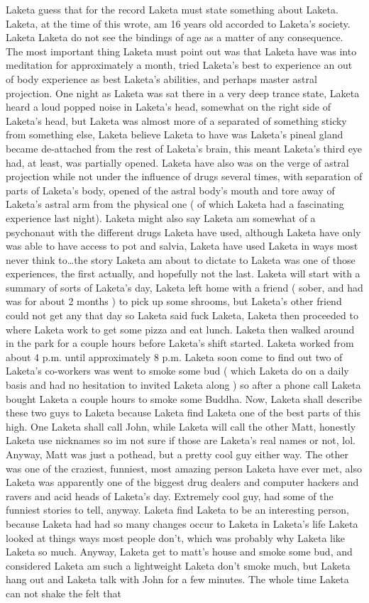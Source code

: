\documentclass[12pt]{book}
\begin{document}
Laketa guess that for the record Laketa must state something about Laketa. Laketa, at the time of this wrote, am 16 years old accorded to Laketa's society. Laketa Laketa do not see the bindings of age as a matter of any consequence. The most important thing Laketa must point out was that Laketa have was into meditation for approximately a month, tried Laketa's best to experience an out of body experience as best Laketa's abilities, and perhaps master astral projection. One night as Laketa was sat there in a very deep trance state, Laketa heard a loud popped noise in Laketa's head, somewhat on the right side of Laketa's head, but Laketa was almost more of a separated of something sticky from something else, Laketa believe Laketa to have was Laketa's pineal gland became de-attached from the rest of Laketa's brain, this meant Laketa's third eye had, at least, was partially opened. Laketa have also was on the verge of astral projection while not under the influence of drugs several times, with separation of parts of Laketa's body, opened of the astral body's mouth and tore away of Laketa's astral arm from the physical one ( of which Laketa had a fascinating experience last night). Laketa might also say Laketa am somewhat of a psychonaut with the different drugs Laketa have used, although Laketa have only was able to have access to pot and salvia, Laketa have used Laketa in ways most never think to\ldots the story Laketa am about to dictate to Laketa was one of those experiences, the first actually, and hopefully not the last. Laketa will start with a summary of sorts of Laketa's day, Laketa left home with a friend ( sober, and had was for about 2 months ) to pick up some shrooms, but Laketa's other friend could not get any that day so Laketa said fuck Laketa, Laketa then proceeded to where Laketa work to get some pizza and eat lunch. Laketa then walked around in the park for a couple hours before Laketa's shift started. Laketa worked from about 4 p.m. until approximately 8 p.m. Laketa soon come to find out two of Laketa's co-workers was went to smoke some bud ( which Laketa do on a daily basis and had no hesitation to invited Laketa along ) so after a phone call Laketa bought Laketa a couple hours to smoke some Buddha. Now, Laketa shall describe these two guys to Laketa because Laketa find Laketa one of the best parts of this high. One Laketa shall call John, while Laketa will call the other Matt, honestly Laketa use nicknames so im not sure if those are Laketa's real names or not, lol. Anyway, Matt was just a pothead, but a pretty cool guy either way. The other was one of the craziest, funniest, most amazing person Laketa have ever met, also Laketa was apparently one of the biggest drug dealers and computer hackers and ravers and acid heads of Laketa's day. Extremely cool guy, had some of the funniest stories to tell, anyway. Laketa find Laketa to be an interesting person, because Laketa had had so many changes occur to Laketa in Laketa's life Laketa looked at things ways most people don't, which was probably why Laketa like Laketa so much. Anyway, Laketa get to matt's house and smoke some bud, and considered Laketa am such a lightweight Laketa don't smoke much, but Laketa hang out and Laketa talk with John for a few minutes. The whole time Laketa can not shake the felt that 
\end{document}
